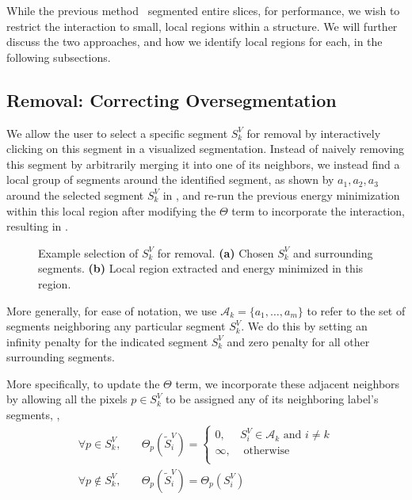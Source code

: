 \documentclass[]{spie}  %
\begin{document}
While the previous method~\cite{waggoner:11} segmented entire slices,
for performance, we wish to restrict the interaction to small, local
regions within a structure.  We will further discuss the two
approaches, and how we identify local regions for each, in the
following subsections.

\subsection{Removal: Correcting Oversegmentation}

We allow the user to select a specific segment $S^V_k$ for removal by
interactively clicking on this segment in a visualized segmentation.
Instead of naively removing this segment by arbitrarily merging it
into one of its neighbors, we instead find a local group of segments
around the identified segment, as shown by $a_1, a_2, a_3$ around the
selected segment $S^V_k$ in , and re-run the
previous energy minimization within this local region after modifying
the $\Theta$ term to incorporate the interaction, resulting in
.
\begin{figure}[htbp]
\centering
{}
\hspace{0.1em}
\caption{Example selection of $S^V_k$ for removal.  \textbf{(a)}
  Chosen $S^V_k$ and surrounding segments.  \textbf{(b)} Local region
  extracted and energy minimized in this
  region.} \label{fig:removal-ex}
\end{figure}
More generally, for ease of notation, we use $ \mathcal{A}_k = \{a_1,
\ldots, a_m\} $ to refer to the set of segments neighboring any
particular segment $S^V_k$.  We do this by setting an infinity penalty
for the indicated segment $S^V_k$ and zero penalty for all other
surrounding segments.

More specifically, to update the $\Theta$ term, we incorporate these
adjacent neighbors by allowing all the pixels $p\in S^V_k$ to be
assigned any of its neighboring label's segments, \ie,
\begin{equation}\label{eq:remove}
\begin{aligned}
 \forall p \in S^V_k ,& \quad \Theta_p(\tilde{S}^V_i) = \left\{
   \begin{array}{lcr}
     0, & S^V_i \in \mathcal{A}_k \textrm{ and } i \neq k  \\
     \infty, & \textrm{ otherwise} \\
   \end{array}
 \right. \\
\forall p \notin S^V_k ,& \quad \Theta_p(\tilde{S}^V_i) = \Theta_p(S^V_i)
\end{aligned}
\end{equation}
\end{document}
